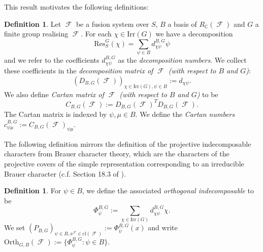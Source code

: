 \documentclass[12pt]{article}
\DeclareMathOperator{\C}{\mathbb{C}}
\DeclareMathOperator{\sF}{\mathcal{F}}
\theoremstyle{plain}
\theoremstyle{definition}
\newtheorem{defn}[thm]{Definition}
\begin{document}
This result motivates the  following definitions:
\begin{defn}\label{decomp matrix defn}
Let $\sF$ be a fusion system over $S$, $B$ a basis of $R_{\C}(\sF)$ and $G$ a finite group realising $\sF$. For each  $\chi \in \text{Irr}(G)$ we have a decomposition
\[\mathrm{Res}^G_S(\chi) = \sum_{\psi \in B} d_{\chi\psi}^{B,G}\psi\]
and we refer to the coefficients $d_{\chi\psi}^{B,G}$ as the \emph{decomposition numbers}. We collect these coefficients in the \emph{decomposition matrix of $\sF$ (with respect to $B$ and $G$)}: 
\[(D_{B,G}(\sF))_{\chi \in \mathrm{Irr}(G), \psi \in B} := d_{\chi\psi}.\]
We also define \emph{Cartan matrix of $\sF$ (with respect to $B$ and $G$)} to be
\[C_{B, G}(\sF) := D_{B, G}(\sF)^TD_{B, G}(\sF).\]
The Cartan matrix is indexed by $\psi, \mu \in B$. 
We define the \emph{Cartan numbers} $c^{B,G}_{\psi\mu} := C_{B,G}(\sF)_{\psi\mu}$.
\end{defn}
The following definition mirrors the definition of the projective indecomposable characters from Brauer character theory, which are the characters of the projective covers of the simple representation corresponding to an irreducible Brauer character (c.f. Section 18.3 of \cite{serre}).
\begin{defn}
For $\psi \in B$, we define the associated \emph{orthogonal indecomposable} to be \[\displaystyle\Phi^{B,G}_{\psi} := \sum_{\chi \in \mathrm{Irr}(G)} d^{B,G}_{\chi\psi}\chi.\] 
We set $(P_{B,G})_{\psi \in B, x^{\sF} \in \text{cl}(\sF)} := \Phi^{B,G}_{\psi}(x)$ and write $\mathrm{Orth}_{G, B}(\sF) := \{\Phi^{B,G}_{\psi} \colon \psi \in B\}$.
\end{defn}
\end{document}
